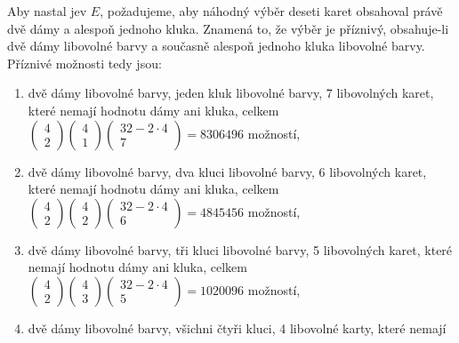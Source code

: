 \begin{example}
    Aby nastal jev \(E\), požadujeme, aby náhodný výběr deseti karet obsahoval právě dvě dámy a 
    alespoň jednoho kluka. Znamená to, že výběr je příznivý, obsahuje-li dvě dámy libovolné barvy a 
    současně alespoň jednoho kluka libovolné barvy. Příznivé možnosti tedy jsou:
    \begin{enumerate}
    \item  dvě dámy libovolné barvy, jeden kluk libovolné barvy, \num{7} libovolných karet, které 
           nemají hodnotu dámy ani kluka, celkem 
           \(\begin{pmatrix} 4 \\ 2 \end{pmatrix}
             \begin{pmatrix} 4 \\ 1\end{pmatrix}
             \begin{pmatrix} 32-2\cdot4 \\ 7 \end{pmatrix} = \num{8306496}\) možností,
    \item dvě dámy libovolné barvy, dva kluci libovolné barvy, \num{6} libovolných karet, které 
          nemají hodnotu dámy ani kluka, celkem 
          \(\begin{pmatrix} 4 \\ 2 \end{pmatrix}
            \begin{pmatrix} 4 \\ 2\end{pmatrix}
            \begin{pmatrix} 32-2\cdot4 \\ 6 \end{pmatrix} = \num{4845456}\) možností,
    \item dvě dámy libovolné barvy, tři kluci libovolné barvy, \num{5} libovolných karet, které 
          nemají hodnotu dámy ani kluka, celkem 
          \(\begin{pmatrix} 4 \\ 2 \end{pmatrix}
            \begin{pmatrix} 4 \\ 3\end{pmatrix}
            \begin{pmatrix} 32-2\cdot4 \\ 5 \end{pmatrix} = \num{1020096}\) možností,
    \item dvě dámy libovolné barvy, všichni čtyři kluci, \num{4} libovolné karty, které nemají 

\end{enumerate}
\end{example}
